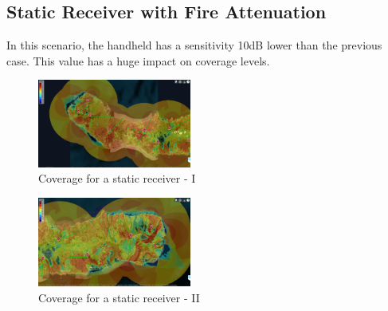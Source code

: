 \documentclass[letterpaper, 10 pt, conference]{ieeeconf}  %
\begin{document}
\subsection{Static Receiver with Fire Attenuation}\noindent
In this scenario, the handheld has a sensitivity 10dB lower than the previous case. This value has a huge impact on coverage levels.
\begin{figure}[h!]
    \centering
    \includegraphics[width=0.45\textwidth]{esteEstatico.JPG}
    \caption{Coverage for a static receiver - I}
    \label{fig:estaticoESTE}
\end{figure}
\begin{figure}[h!]
    \centering
    \includegraphics[width=0.45\textwidth]{OesteEstatico.JPG}
    \caption{Coverage for a static receiver - II}
    \label{fig:estaticoOeste}
\end{figure} \FloatBarrier
\end{document}
